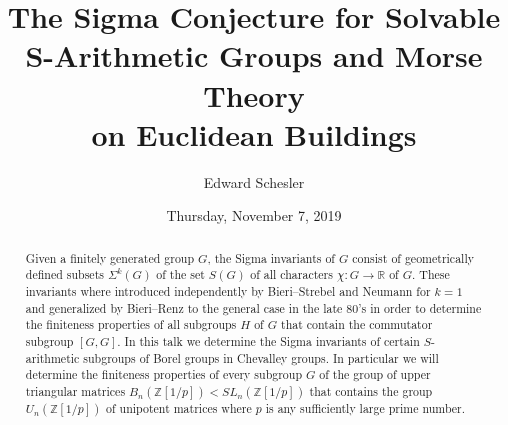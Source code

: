 \documentclass{UAmathtalk}
\author{Edward Schesler}
\title{The Sigma Conjecture for Solvable S-Arithmetic Groups and Morse Theory\\on Euclidean Buildings}
\date{Thursday, November 7, 2019}
\begin{document}
\maketitle

\begin{abstract}
Given a finitely generated group $G$, the Sigma invariants of $G$ consist of geometrically defined subsets $\Sigma^k(G)$ of the set $S(G)$ of all characters $\chi\colon G \to \mathbb{R}$ of $G$. These invariants where introduced independently by Bieri--Strebel and Neumann for $k=1$ and generalized by Bieri--Renz to the general case in the late 80's in order to determine the finiteness properties of all subgroups $H$ of $G$ that contain the commutator subgroup $[G,G]$. In this talk we determine the Sigma invariants of certain $S$-arithmetic subgroups of Borel groups in Chevalley groups. In particular we will determine the finiteness properties of every subgroup $G$ of the group of upper triangular matrices $B_n(\mathbb{Z}[1/p]) < SL_n(\mathbb{Z}[1/p])$ that contains the group $U_n(\mathbb{Z}[1/p])$ of unipotent matrices where $p$ is any sufficiently large prime number.
\end{abstract}
\end{document}
